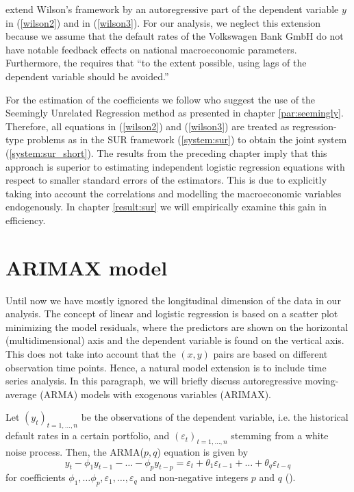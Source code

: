 \documentclass[a4paper, 11pt]{scrreprt}
\begin{document}
\textcite{wong2006framework} extend Wilson's framework by an autoregressive part of the dependent variable $y$ in (\ref{wilson2}) and in (\ref{wilson3}). For our analysis, we neglect this extension because we assume that the default rates of the Volkswagen Bank GmbH do not have notable feedback effects on national macroeconomic parameters. 
Furthermore, the \textcite[chapter 2.3.1.5.v]{ecb2018srep} requires that ``to the extent possible, using lags of the dependent variable should be avoided.''

For the estimation of the coefficients we follow \textcite{wong2006framework} who suggest the use of the Seemingly Unrelated Regression method as presented in chapter \ref{par:seemingly}. 
Therefore, all equations in (\ref{wilson2}) and (\ref{wilson3}) are treated as regression-type problems as in the SUR framework (\ref{system:sur}) to obtain the joint system (\ref{system:sur_short}). The results from the preceding chapter imply that this approach is superior to estimating independent logistic regression equations with respect to smaller standard errors of the estimators. This is due to explicitly taking into account the correlations and modelling the macroeconomic variables endogenously. In chapter \ref{result:sur} we will empirically examine this gain in efficiency.

\section{ARIMAX model}\label{par:arimax}

Until now we have mostly ignored the longitudinal dimension of the data in our analysis. The concept of linear and logistic regression is based on a scatter plot minimizing the model residuals, where the predictors are shown on the horizontal (multidimensional) axis and the dependent variable is found on the vertical axis.
This does not take into account that the $(x,y)$ pairs are based on different observation time points. Hence, a natural model extension is to include time series analysis.
In this paragraph, we will briefly discuss autoregressive moving-average (ARMA) models with exogenous variables (ARIMAX).

Let $(y_t)_{t=1,\ldots,n}$ be the observations of the dependent variable, i.e. the historical default rates in a certain portfolio, and $(\varepsilon_t)_{t=1,\ldots,n}$ stemming from a white noise process. Then, the ARMA($p,q$) equation is given by
\begin{equation}\label{arma}
y_t - \phi_1 y_{t-1} - \ldots - \phi_p y_{t-p} = \varepsilon_t + \theta_1 \varepsilon_{t-1} + \ldots + \theta_q \varepsilon_{t-q}
\end{equation}
for coefficients $\phi_1, \ldots \phi_p, \varepsilon_1, \ldots, \varepsilon_q$ and
non-negative integers $p$ and $q$ (\textcite[definition 7.1]{kreiss2006zeitreihenanalysis}).
\end{document}
